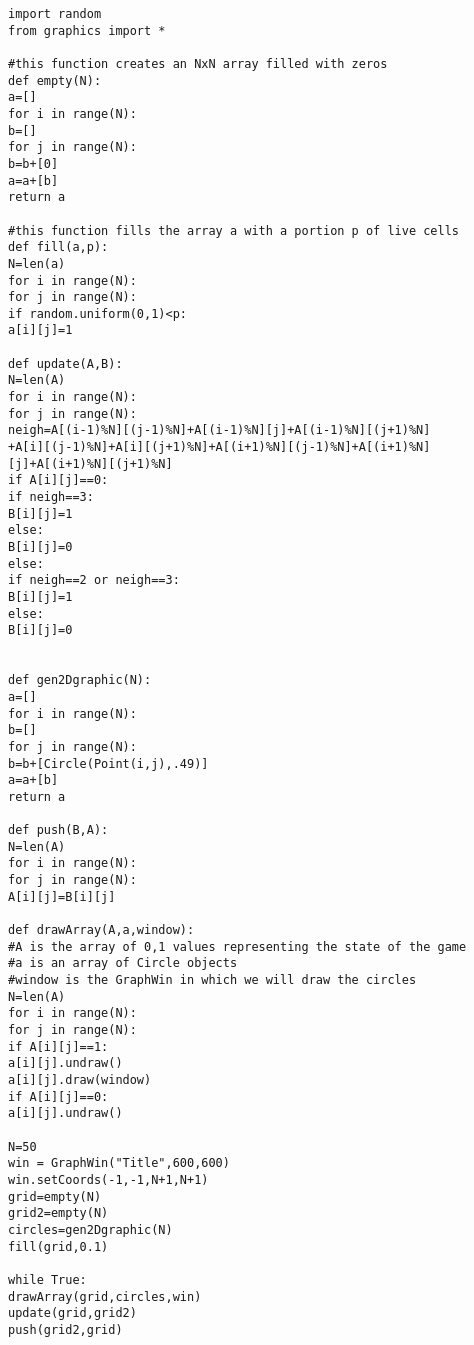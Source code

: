 
\begin{framed}
\begin{verbatim}
import random
from graphics import *

#this function creates an NxN array filled with zeros
def empty(N):
a=[]
for i in range(N):
b=[]
for j in range(N):
b=b+[0]
a=a+[b]
return a

#this function fills the array a with a portion p of live cells
def fill(a,p):
N=len(a)
for i in range(N):
for j in range(N):
if random.uniform(0,1)<p:
a[i][j]=1

def update(A,B):
N=len(A)
for i in range(N):
for j in range(N):
neigh=A[(i-1)%N][(j-1)%N]+A[(i-1)%N][j]+A[(i-1)%N][(j+1)%N]
+A[i][(j-1)%N]+A[i][(j+1)%N]+A[(i+1)%N][(j-1)%N]+A[(i+1)%N]
[j]+A[(i+1)%N][(j+1)%N]
if A[i][j]==0:
if neigh==3:
B[i][j]=1
else:
B[i][j]=0
else:
if neigh==2 or neigh==3:
B[i][j]=1
else:
B[i][j]=0


def gen2Dgraphic(N):
a=[]
for i in range(N):
b=[]
for j in range(N):
b=b+[Circle(Point(i,j),.49)]
a=a+[b]
return a

def push(B,A):
N=len(A)
for i in range(N):
for j in range(N):
A[i][j]=B[i][j]

def drawArray(A,a,window):
#A is the array of 0,1 values representing the state of the game
#a is an array of Circle objects
#window is the GraphWin in which we will draw the circles
N=len(A)
for i in range(N):
for j in range(N):
if A[i][j]==1:
a[i][j].undraw()
a[i][j].draw(window)
if A[i][j]==0:
a[i][j].undraw()

N=50
win = GraphWin("Title",600,600)
win.setCoords(-1,-1,N+1,N+1)
grid=empty(N)
grid2=empty(N)
circles=gen2Dgraphic(N)
fill(grid,0.1)

while True:
drawArray(grid,circles,win)
update(grid,grid2)
push(grid2,grid)


\end{verbatim}
\end{framed}

